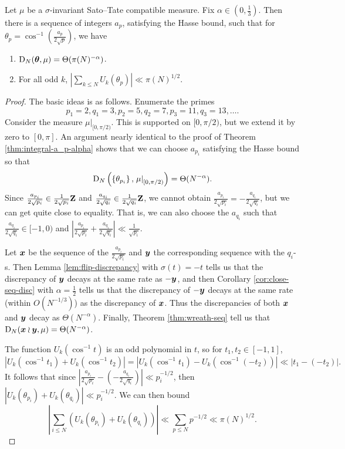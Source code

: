 \begin{theorem}\label{thm:int-flip-seq}
Let $\mu$ be a $\sigma$-invariant Sato--Tate compatible measure. Fix 
$\alpha\in \left(0,\frac 1 3\right)$. Then there is a sequence of integers 
$a_p$, satisfying the Hasse bound, such that for 
$\theta_p =\cos^{-1}\left( \frac{a_p}{2\sqrt p}\right)$, we have
\begin{enumerate}
\item
$\operatorname{D}_N({\boldsymbol\theta},\mu) = \Theta(\pi(N)^{-\alpha})$. 

\item
For all odd $k$, 
$\left| \sum_{k\leqslant N} U_k(\theta_p)\right| \ll \pi(N)^{1/2}$. 
\end{enumerate}
\end{theorem}
\begin{proof}
The basic ideas is as follows. Enumerate the primes 
\[
	p_1 = 2, q_1 = 3, p_2 = 5, q_2 = 7, p_3 = 11, q_3 = 13, \dots .
\]
Consider the measure $\left.\mu\right|_{[0,\pi/2)}$. This is supported on 
$[0,\pi/2)$, but we extend it by zero to $[0,\pi]$. An argument 
nearly identical to the proof of Theorem \ref{thm:integral-a_p-alpha} shows 
that we can choose $a_{p_i}$ satisfying the Hasse bound so that 
\[
	\operatorname{D}_N\left( \left\{\theta_{p_i}\right\},\left.\mu\right|_{[0,\pi/2)}\right) = \Theta(N^{-\alpha}) .
\]
Since $\frac{a_{p_i}}{2\sqrt{p_i}}\in \frac{1}{2\sqrt{p_i}} \mathbf{Z}$ and 
$\frac{a_{q_i}}{2\sqrt{q_i}}\in \frac{1}{2\sqrt{q_i}}\mathbf{Z}$, we cannot obtain 
$\frac{a_{p_i}}{2\sqrt{p_i}} = - \frac{a_{q_i}}{2\sqrt{q_i}}$, but we can get 
quite close to equality. That is, we can also choose the $a_{q_i}$ such that 
$\frac{a_{q_i}}{2\sqrt{q_i}}\in [-1,0)$ and 
$\left| \frac{a_{p_i}}{2\sqrt{p_i}} + \frac{a_{q_i}}{2\sqrt{q_i}}\right| \ll \frac{1}{\sqrt{p_i}}$. 

Let ${\boldsymbol x}$ be the sequence of the $\frac{a_{p_i}}{2\sqrt{p_i}}$ and ${\boldsymbol y}$  
the corresponding sequence with the $q_i$-s. Then Lemma 
\ref{lem:flip-discrepancy} with $\sigma(t) = -t$ tells us that the discrepancy 
of ${\boldsymbol y}$ decays at the same rate as $-{\boldsymbol y}$, and then Corollary 
\ref{cor:close-seq-disc} with $\alpha = \frac 1 2$ tells us that the 
discrepancy of $-{\boldsymbol y}$ decays at the same rate (within $O(N^{-1/3})$) as the 
discrepancy of ${\boldsymbol x}$. Thus the discrepancies of both ${\boldsymbol x}$ and ${\boldsymbol y}$ decay as 
$\Theta(N^{-\alpha})$. Finally, Theorem \ref{thm:wreath-seq} tell us that 
$\operatorname{D}_N({\boldsymbol x}\wr{\boldsymbol y},\mu) = \Theta(N^{-\alpha})$. 

The function $U_k(\cos^{-1} t)$ is an odd polynomial in $t$, so for 
$t_1,t_2\in [-1,1]$, 
\[
	|U_k(\cos^{-1} t_1) + U_k(\cos^{-1} t_2)| = |U_k(\cos^{-1} t_1) - U_k(\cos^{-1}(-t_2))| \ll |t_1 - (-t_2)|.
\]
It follows that since 
$\left|\frac{a_{p_i}}{2\sqrt{p_i}} - \left(- \frac{a_{q_i}}{2\sqrt{q_i}}\right)\right| \ll p_i^{-1/2}$, 
then $|U_k(\theta_{p_i}) + U_k(\theta_{q_i})|\ll p_i^{-1/2}$. 
We can then bound 
\[
	\left| \sum_{i\leqslant N} \left(U_k(\theta_{p_i}) + U_k(\theta_{q_i})\right)\right| \ll \sum_{p\leqslant N} p^{-1/2} \ll \pi(N)^{1/2} .
\]
\end{proof}

